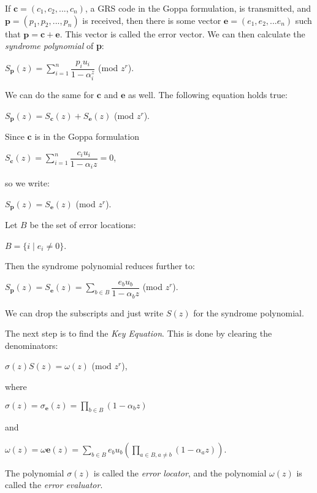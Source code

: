 \documentclass{article}
\begin{document}
If $\textbf{c} = (c_{1},c_{2},...,c_{n})$, a GRS code in the Goppa formulation, is transmitted, and $\textbf{p} = (p_{1},p_{2},...,p_{n})$ is received, then there is some vector $\textbf{e} = (e_{1},e_{2},...e_{n})$ such that $\textbf{p} = \textbf{c} + \textbf{e}$. This vector is called the error vector. We can then calculate the \textit{syndrome polynomial} of \textbf{p}:
\begin{center}
$S_{\textbf{p}}(z) = \sum\limits_{i=1}^{n} \dfrac{p_{i}u_{i}}{1 - \alpha_{i}^{z}}$ (mod $z^{r}$).
\end{center}
We can do the same for $\textbf{c}$ and $\textbf{e}$ as well. The following equation holds true:
\begin{center}
$S_{\textbf{p}}(z) = S_{\textbf{c}}(z) + S_{\textbf{e}}(z)$ (mod $z^{r}$).
\end{center}
Since $\textbf{c}$ is in the Goppa formulation
\begin{center}
$S_{\textbf{c}}(z) = \sum\limits_{i = 1}^{n} \dfrac{c_{i}u_{i}}{1 - \alpha_{i}z} = 0$,
\end{center}
so we write:
\begin{center}
$S_{\textbf{p}}(z) = S_{\textbf{e}}(z)$ (mod $z^{r}$).
\end{center}
Let $B$ be the set of error locations:
\begin{center}
$B =  \{i \mid e_{i} \neq 0\}$.
\end{center}
Then the syndrome polynomial reduces further to:
\begin{center}
$S_{\textbf{p}}(z) = S_{\textbf{e}}(z) = \sum\limits_{b \in B} \dfrac{e_{b}u_{b}}{1 - \alpha_{b}z} $ (mod $z^{r}$).
\end{center}
We can drop the subscripts and just write $S(z)$ for the syndrome polynomial.

The next step is to find the \textit{Key Equation}. This is done by clearing the denominators:
\begin{center}
$\sigma(z)S(z) = \omega(z)$ (mod $z^{r}$),
\end{center}
where
\begin{center}
$\sigma(z) = \sigma_{\textbf{e}}(z) = \prod\limits_{b \in B} (1 - \alpha_{b}z)$
\end{center}
and
\begin{center}
$\omega(z) = \omega{\textbf{e}}(z) = \sum\limits_{b \in B} e_{b}u_{b}\left(\prod\limits_{a \in B, a \neq b} (1 - \alpha_{a}z)\right)$.
\end{center}
The polynomial $\sigma(z)$ is called the \textit{error locator}, and the polynomial $\omega(z)$ is called the \textit{error evaluator}.
\end{document}
